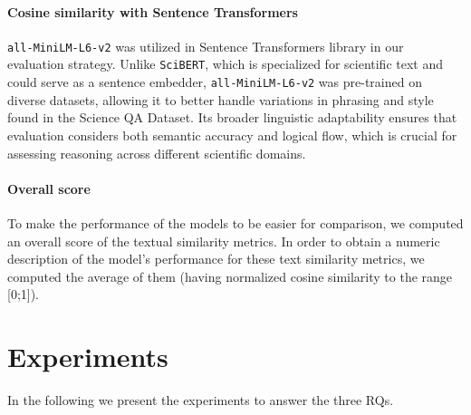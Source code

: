 \documentclass{article}
\begin{document}
\paragraph{Cosine similarity with Sentence Transformers}
\texttt{all-MiniLM-L6-v2} was utilized in Sentence Transformers library in our evaluation strategy.
Unlike \texttt{SciBERT}, which is specialized for scientific text and could serve as a sentence embedder, \texttt{all-MiniLM-L6-v2} was pre-trained on diverse datasets, allowing it to better handle variations in phrasing and style found in the Science QA Dataset.
Its broader linguistic adaptability ensures that evaluation considers both semantic accuracy and logical flow, which is crucial for assessing reasoning across different scientific domains.

\paragraph{Overall score}
To make the performance of the models to be easier for comparison, we computed an overall score of the textual similarity metrics. In order to obtain a numeric description of the model's performance for these text similarity metrics, we computed the average of them (having normalized cosine similarity to the range [0;1]). 

\section{Experiments}
\label{experiments}
In the following we present the experiments to answer the three RQs.
\end{document}
